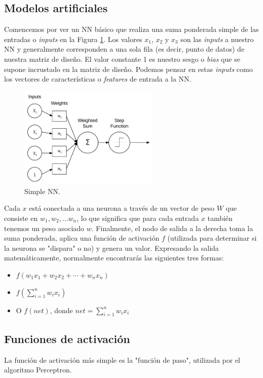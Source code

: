 \documentclass[a4paper,12pt]{article}
\begin{document}
\subsection{Modelos artificiales}
Comencemos por ver un NN básico que realiza una suma ponderada simple de las entradas o \textit{inputs} en la Figura \ref{fig:simplenn}. Los valores $x_1$, $x_2$ y $x_3$ son las \textit{inputs} a nuestro NN y generalmente corresponden a una sola fila (es decir, punto de datos) de nuestra matriz de diseño. El valor constante 1 es nuestro sesgo o \textit{bias} que se supone incrustado en la matriz de diseño. Podemos pensar en estas \textit{inputs} como los vectores de características o \textit{features} de entrada a la NN.

\begin{figure}[H]
	\begin{center}				
	\includegraphics[width=0.6\textwidth]{020.png}
  	\caption{Simple NN.}
  	\label{fig:simplenn}
  	\end{center}
\end{figure}

Cada $x$ está conectada a una neurona a través de un vector de peso $W$ que consiste en $w_1, w_2, \ldots w_n$, lo que significa que para cada entrada $x$ también tenemos un peso asociado $w$.
Finalmente, el nodo de salida a la derecha toma la suma ponderada, aplica una función de activación $f$ (utilizada para determinar si la neurona se "dispara" o no) y genera un valor. Expresando la salida matemáticamente, normalmente encontrarás las siguientes tres formas:
\begin{itemize}[noitemsep, topsep=2pt]
\item $f(w_1x_1 + w_2x_2 + \cdots + w_nx_n)$
\item $f(\sum_{i=1}^{n} w_ix_i)$	
\item O $f(net)$, donde $net = \sum_{i=1}^{n} w_ix_i$
\end{itemize}

\subsection{Funciones de activación}
La función de activación más simple es la "función de paso", utilizada por el algoritmo Perceptron.
\end{document}
